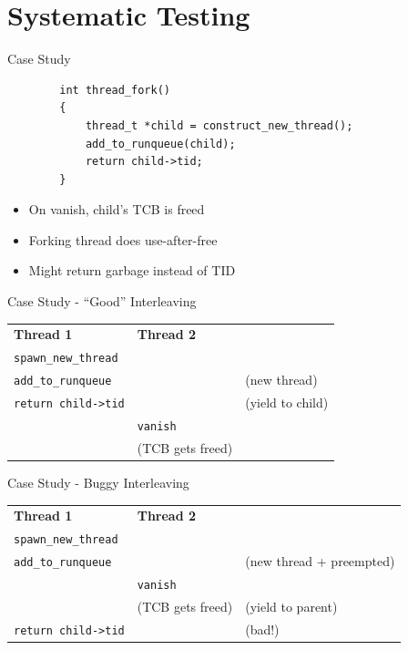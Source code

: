\documentclass[xcolor=dvipsnames]{beamer}
\begin{document}

\section{Systematic Testing}


\begin{frame}[fragile]{Case Study}
	\begin{center}
	\begin{verbatim}
	    int thread_fork()
	    {
	        thread_t *child = construct_new_thread();
	        add_to_runqueue(child);
	        return child->tid;
	    }
	\end{verbatim}
	\end{center}
	\pause

	\begin{itemize}
		\item On vanish, child's TCB is freed
		\item Forking thread does use-after-free
		\item Might return garbage instead of TID
	\end{itemize}
\end{frame}

\begin{frame}{Case Study - ``Good'' Interleaving}
	\begin{tabular}{|l|l|l}
		\cline{1-2}
		{\bf Thread 1} & {\bf Thread 2} & \\
		\cline{1-2}
		\texttt{spawn\_new\_thread} && \\
		\cline{1-2}
		\texttt{add\_to\_runqueue} && (new thread) \\
		\cline{1-2}
		\texttt{return child->tid} && (yield to child) \\
		\cline{1-2}
		& \texttt{vanish} & \\
		\cline{1-2}
		& (TCB gets freed) & \\
		\cline{1-2}
	\end{tabular}
\end{frame}

\begin{frame}{Case Study - Buggy Interleaving}
	\begin{tabular}{|l|l|l}
		\cline{1-2}
		{\bf Thread 1} & {\bf Thread 2} & \\
		\cline{1-2}
		\texttt{spawn\_new\_thread} && \\
		\cline{1-2}
		\texttt{add\_to\_runqueue} && (new thread + preempted) \\
		\cline{1-2}
		& \texttt{vanish} & \\
		\cline{1-2}
		& (TCB gets freed) & (yield to parent) \\
		\cline{1-2}
		\texttt{return child->tid} && (bad!) \\
		\cline{1-2}
	\end{tabular}
\end{frame}
\end{document}
